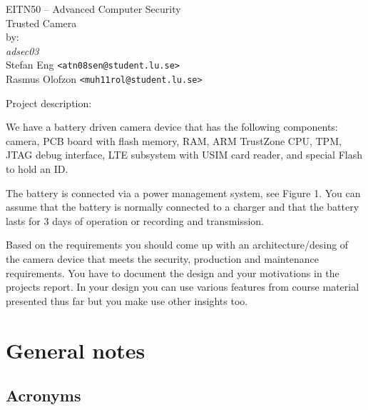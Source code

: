 \documentclass[10pt]{article}
\newcommand{\comm}[1]{{\itshape{{\leavevmode\color{gray}#1}}}}
\begin{document}

  \thispagestyle{empty}
  \vspace*{3cm}
  \begin{center}
    \huge{EITN50 -- Advanced Computer Security} \\
    \vspace{0.3cm}
    \LARGE{Trusted Camera} \\
    \vspace{1cm}
    \large{by: \\ \vspace{0.2cm}
	\textit{adsec03} \\
        Stefan Eng \texttt{<atn08sen@student.lu.se>} \\
        Rasmus Olofzon \texttt{<muh11rol@student.lu.se>}
        } \\
  \end{center}


  \newpage


  \comm{%
    Project description:

    We have a battery driven camera device that has the following components:
    camera, PCB board with flash memory, RAM, ARM TrustZone CPU, TPM, JTAG
    debug interface, LTE subsystem with USIM card reader, and special Flash
    to hold an ID.

    The battery is connected via a power management system, see Figure 1. You
    can assume that the battery is normally connected to a charger and that
    the battery lasts for 3 days of operation or recording and transmission.

    Based on the requirements you should come up with an architecture/desing
    of the camera device that meets the security, production and maintenance
    requirements. You have to document the design and your motivations in the
    projects report. In your design you can use various features from course
    material presented thus far but you make use other insights too.
  }

  \section{General notes}

    \subsection{Acronyms}
\end{document}
